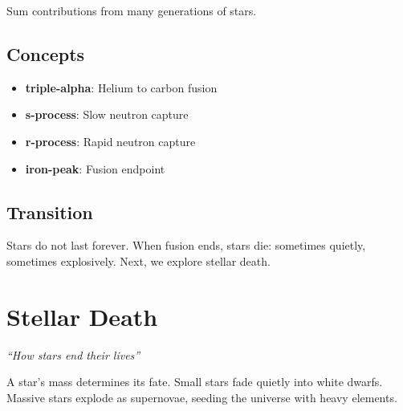 \documentclass[
  11pt,
  letterpaper,
  twoside,
  openright]{book}
\providecommand{\tightlist}{%
  \setlength{\itemsep}{0pt}\setlength{\parskip}{0pt}}
\begin{document}
Sum contributions from many generations of stars.

\section{Concepts}\label{concepts-21}

\begin{itemize}
\tightlist
\item
  \textbf{triple-alpha}: Helium to carbon fusion
\item
  \textbf{s-process}: Slow neutron capture
\item
  \textbf{r-process}: Rapid neutron capture
\item
  \textbf{iron-peak}: Fusion endpoint
\end{itemize}

\section{Transition}\label{transition-21}

Stars do not last forever. When fusion ends, stars die: sometimes
quietly, sometimes explosively. Next, we explore stellar death.

\chapter{Stellar Death}\label{sec-stellar-death}

\emph{``How stars end their lives''}

\begin{tcolorbox}[enhanced jigsaw, coltitle=black, colbacktitle=quarto-callout-note-color!10!white, toprule=.15mm, colframe=quarto-callout-note-color-frame, arc=.35mm, opacityback=0, bottomtitle=1mm, toptitle=1mm, breakable, colback=white, titlerule=0mm, opacitybacktitle=0.6, title=\textcolor{quarto-callout-note-color}{\faInfo}\hspace{0.5em}{Key Revelation}, rightrule=.15mm, bottomrule=.15mm, leftrule=.75mm, left=2mm]

A star's mass determines its fate. Small stars fade quietly into white
dwarfs. Massive stars explode as supernovae, seeding the universe with
heavy elements.

\end{tcolorbox}
\end{document}
